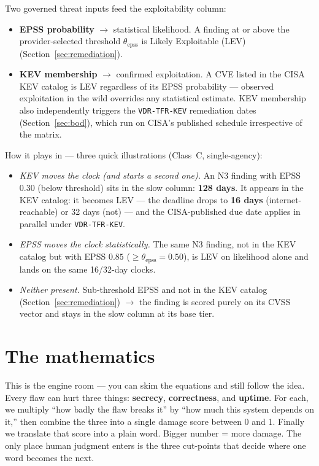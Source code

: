 \documentclass[11pt]{article}
\newcommand{\code}[1]{\texttt{#1}}
\begin{document}
Two governed threat inputs feed the exploitability column:
\begin{itemize}[leftmargin=1.4em]
\item \textbf{EPSS probability} $\rightarrow$ statistical likelihood. A finding at or
  above the provider-selected threshold $\theta_{\text{epss}}$ is Likely Exploitable
  (LEV) (Section~\ref{sec:remediation}).
\item \textbf{KEV membership} $\rightarrow$ confirmed exploitation. A CVE listed in
  the CISA KEV catalog is LEV regardless of its EPSS probability --- observed
  exploitation in the wild overrides any statistical estimate. KEV membership also
  independently triggers the \code{VDR-TFR-KEV} remediation dates
  (Section~\ref{sec:bod}), which run on CISA's published schedule irrespective of
  the matrix.
\end{itemize}

\noindent How it plays in --- three quick illustrations (Class~C, single-agency):
\begin{itemize}[leftmargin=1.4em]
\item \emph{KEV moves the clock (and starts a second one).} An N3 finding with EPSS
  $0.30$ (below threshold) sits in the slow column: \textbf{128 days}. It appears in
  the KEV catalog: it becomes LEV --- the deadline drops to \textbf{16 days}
  (internet-reachable) or 32 days (not) --- and the CISA-published due date applies
  in parallel under \code{VDR-TFR-KEV}.
\item \emph{EPSS moves the clock statistically.} The same N3 finding, not in the KEV
  catalog but with EPSS $0.85$ ($\ge \theta_{\text{epss}} = 0.50$), is LEV on
  likelihood alone and lands on the same 16/32-day clocks.
\item \emph{Neither present.} Sub-threshold EPSS and not in the KEV catalog
  (Section~\ref{sec:remediation}) $\rightarrow$ the finding is scored purely on its
  CVSS vector and stays in the slow column at its base tier.
\end{itemize}

\section{The mathematics}
\label{sec:math}
\begin{plain}
This is the engine room --- you can skim the equations and still follow the idea.
Every flaw can hurt three things: \textbf{secrecy}, \textbf{correctness}, and
\textbf{uptime}. For each, we multiply ``how badly the flaw breaks it'' by ``how much
this system depends on it,'' then combine the three into a single damage score
between 0 and 1. Finally we translate that score into a plain word. Bigger number =
more damage. The only place human judgment enters is the three cut-points that decide
where one word becomes the next.
\end{plain}
\end{document}
